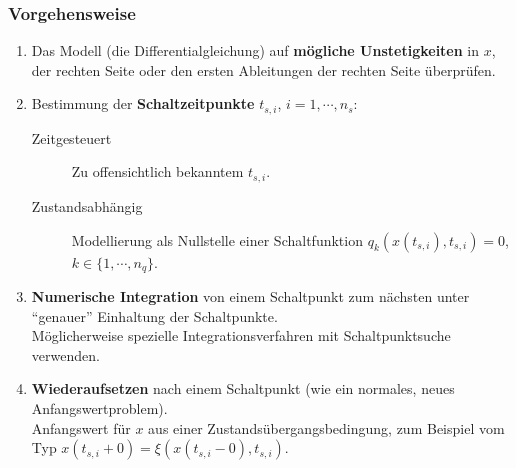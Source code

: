             \subsubsection{Vorgehensweise} %
                \begin{enumerate}
                	\item Das Modell (die Differentialgleichung) auf \textbf{mögliche Unstetigkeiten} in \(x\), der rechten Seite oder den ersten Ableitungen der rechten Seite überprüfen.
                	\item Bestimmung der \textbf{Schaltzeitpunkte} \( t _ {s,i} \), \( i = 1, \cdots, n _ s \):
                    	\begin{description}
                    		\item[Zeitgesteuert] Zu offensichtlich bekanntem \( t _ { s, i } \).
                    		\item[Zustandsabhängig] Modellierung als Nullstelle einer Schaltfunktion \( q _ k (x(t _ { s, i }), t _ { s, i }) = 0 \), \( k \in \{ 1, \cdots, n _ q \} \).
                    	\end{description}
                    \item \textbf{Numerische Integration} von einem Schaltpunkt zum nächsten unter \enquote{genauer} Einhaltung der Schaltpunkte. \\ Möglicherweise spezielle Integrationsverfahren mit Schaltpunktsuche verwenden.
                    \item \textbf{Wiederaufsetzen} nach einem Schaltpunkt (wie ein normales, neues Anfangswertproblem). \\ Anfangswert für \(x\) aus einer Zustandsübergangsbedingung, zum Beispiel vom Typ \( x(t _ { s, i } + 0) = \xi(x(t _ { s, i } - 0), t _ { s, i }) \).
                \end{enumerate}


